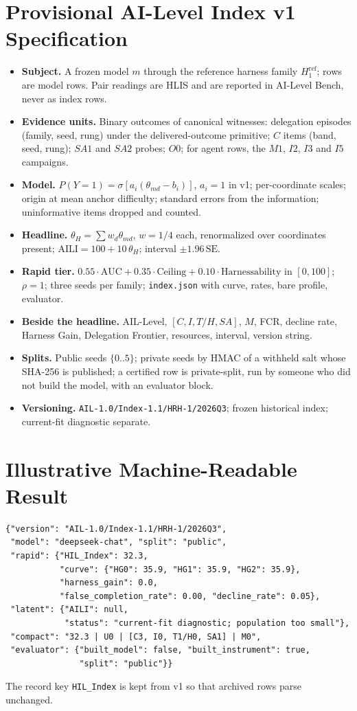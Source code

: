 \documentclass[11pt]{article}
\theoremstyle{definition}
\begin{document}
\section{Provisional AI-Level Index v1 Specification}\label{app:spec}
\begin{itemize}[leftmargin=*,itemsep=1pt]
\item \textbf{Subject.} A frozen model $m$ through the reference harness family $H^{\mathrm{ref}}_1$; rows are model rows. Pair readings are HLIS and are reported in AI-Level Bench, never as index rows.
\item \textbf{Evidence units.} Binary outcomes of canonical witnesses: delegation episodes (family, seed, rung) under the delivered-outcome primitive; $C$ items (band, seed, rung); $SA1$ and $SA2$ probes; $O0$; for agent rows, the $M1$, $I2$, $I3$ and $I5$ campaigns.
\item \textbf{Model.} $P(Y=1) = \sigma[a_i(\theta_{md} - b_i)]$, $a_i = 1$ in v1; per-coordinate scales; origin at mean anchor difficulty; standard errors from the information; uninformative items dropped and counted.
\item \textbf{Headline.} $\theta_H = \sum w_d \theta_{md}$, $w = 1/4$ each, renormalized over coordinates present; $\mathrm{AILI} = 100 + 10\,\theta_H$; interval $\pm 1.96\,\mathrm{SE}$.
\item \textbf{Rapid tier.} $0.55\cdot\mathrm{AUC} + 0.35\cdot\mathrm{Ceiling} + 0.10\cdot\mathrm{Harnessability}$ in $[0, 100]$; $\rho = 1$; three seeds per family; \texttt{index.json} with curve, rates, bare profile, evaluator.
\item \textbf{Beside the headline.} AIL-Level, $[C, I, T/H, SA]$, $M$, FCR, decline rate, Harness Gain, Delegation Frontier, resources, interval, version string.
\item \textbf{Splits.} Public seeds $\{0..5\}$; private seeds by HMAC of a withheld salt whose SHA-256 is published; a certified row is private-split, run by someone who did not build the model, with an evaluator block.
\item \textbf{Versioning.} \texttt{AIL-1.0/\allowbreak Index-1.1/\allowbreak HRH-1/\allowbreak 2026Q3}; frozen historical index; current-fit diagnostic separate.
\end{itemize}

\section{Illustrative Machine-Readable Result}\label{app:json}
\begin{verbatim}
{"version": "AIL-1.0/Index-1.1/HRH-1/2026Q3",
 "model": "deepseek-chat", "split": "public",
 "rapid": {"HIL_Index": 32.3,
           "curve": {"HG0": 35.9, "HG1": 35.9, "HG2": 35.9},
           "harness_gain": 0.0,
           "false_completion_rate": 0.00, "decline_rate": 0.05},
 "latent": {"AILI": null,
            "status": "current-fit diagnostic; population too small"},
 "compact": "32.3 | U0 | [C3, I0, T1/H0, SA1] | M0",
 "evaluator": {"built_model": false, "built_instrument": true,
               "split": "public"}}
\end{verbatim}
\noindent The record key \texttt{HIL\_Index} is kept from v1 so that archived rows parse unchanged.
\end{document}
